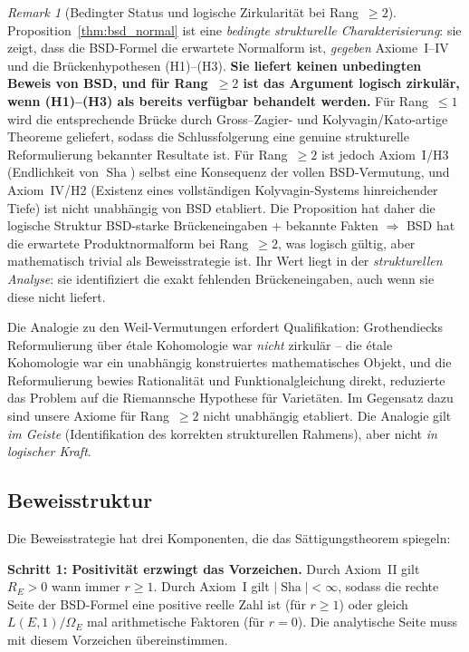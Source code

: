 \documentclass[aps,prd,twocolumn,superscriptaddress,nofootinbib,floatfix]{revtex4-2}
\theoremstyle{definition}
\theoremstyle{remark}
\newtheorem{remark}[theorem]{Remark}
\DeclareMathOperator{\Sha}{Sha}
\begin{document}
\begin{remark}[Bedingter Status und logische Zirkularität bei Rang~$\geq 2$]
\label{rem:conditional_status}
Proposition~\ref{thm:bsd_normal} ist eine \textit{bedingte strukturelle Charakterisierung}: sie zeigt, dass die BSD-Formel die erwartete Normalform ist, \textit{gegeben} Axiome~I--IV und die Brückenhypothesen (H1)--(H3). \textbf{Sie liefert keinen unbedingten Beweis von BSD, und für Rang~$\geq 2$ ist das Argument logisch zirkulär, wenn (H1)--(H3) als bereits verfügbar behandelt werden.} Für Rang~$\leq 1$ wird die entsprechende Brücke durch Gross--Zagier- und Kolyvagin/Kato-artige Theoreme geliefert, sodass die Schlussfolgerung eine genuine strukturelle Reformulierung bekannter Resultate ist. Für Rang~$\geq 2$ ist jedoch Axiom~I/H3 (Endlichkeit von $\Sha$) selbst eine Konsequenz der vollen BSD-Vermutung, und Axiom~IV/H2 (Existenz eines vollständigen Kolyvagin-Systems hinreichender Tiefe) ist nicht unabhängig von BSD etabliert. Die Proposition hat daher die logische Struktur \glqq BSD-starke Brückeneingaben + bekannte Fakten $\Rightarrow$ BSD hat die erwartete Produktnormalform\grqq{} bei Rang~$\geq 2$, was logisch gültig, aber mathematisch trivial als Beweisstrategie ist. Ihr Wert liegt in der \textit{strukturellen Analyse}: sie identifiziert die exakt fehlenden Brückeneingaben, auch wenn sie diese nicht liefert.

Die Analogie zu den Weil-Vermutungen erfordert Qualifikation: Grothendiecks Reformulierung über étale Kohomologie war \textit{nicht} zirkulär -- die étale Kohomologie war ein unabhängig konstruiertes mathematisches Objekt, und die Reformulierung bewies Rationalität und Funktionalgleichung direkt, reduzierte das Problem auf die Riemannsche Hypothese für Varietäten. Im Gegensatz dazu sind unsere Axiome für Rang~$\geq 2$ nicht unabhängig etabliert. Die Analogie gilt \textit{im Geiste} (Identifikation des korrekten strukturellen Rahmens), aber nicht \textit{in logischer Kraft}.
\end{remark}

\subsection{Beweisstruktur}

Die Beweisstrategie hat drei Komponenten, die das Sättigungstheorem spiegeln:

\textbf{Schritt 1: Positivität erzwingt das Vorzeichen.} Durch Axiom~II gilt $R_E > 0$ wann immer $r \geq 1$. Durch Axiom~I gilt $|\Sha| < \infty$, sodass die rechte Seite der BSD-Formel eine positive reelle Zahl ist (für $r \geq 1$) oder gleich $L(E,1)/\Omega_E$ mal arithmetische Faktoren (für $r = 0$). Die analytische Seite muss mit diesem Vorzeichen übereinstimmen.
\end{document}
